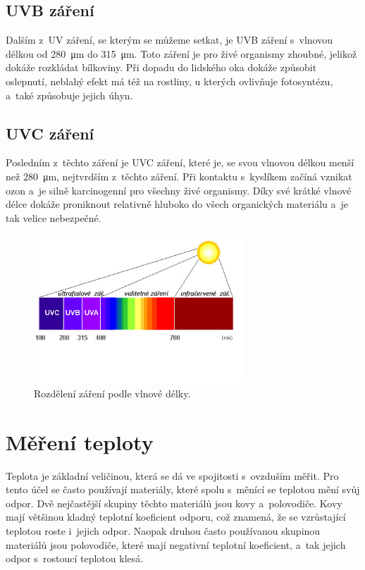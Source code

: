 \subsection{UVB záření}

Dalším z~UV záření, se kterým se můžeme setkat, je UVB záření s~vlnovou délkou od \SI{280}{\micro\metre} do \SI{315}{\micro\metre}. Toto záření je pro živé organismy zhoubné, jelikož dokáže rozkládat bílkoviny. Při dopadu do lidského oka dokáže způsobit oslepnutí, neblahý efekt má též na rostliny, u kterých ovlivňuje fotosyntézu, a~také způsobuje jejich úhyn.

\subsection{UVC záření}

Posledním z~těchto záření je UVC záření, které je, se svou vlnovou délkou menší než \SI{280}{\micro\metre}, nejtvrdším z~těchto záření. Při kontaktu s~kyslíkem začíná vznikat ozon a~je silně karcinogenní pro všechny živé organismy. Díky své krátké vlnové délce dokáže proniknout relativně hluboko do všech organických materiálu a~je tak velice nebezpečné.

\begin{figure}
    \centering
    \includegraphics[width=0.7\textwidth]{obrazky/uv_light.jpg}
    \caption{Rozdělení záření podle vlnové délky.\cite{picture_UVLight}}
    \label{fig_UVLight}
\end{figure}

\section{Měření teploty}

Teplota je základní veličinou, která se dá ve spojitosti s~ovzduším měřit. Pro tento účel se často používají materiály, které spolu s~měnící se teplotou mění svůj odpor. Dvě nejčastější skupiny těchto materiálů jsou kovy a~polovodiče. Kovy mají většinou kladný teplotní koeficient odporu, což znamená, že se vzrůstající teplotou roste i~jejich odpor. Naopak druhou často používanou skupinou materiálů jsou polovodiče, které mají negativní teplotní koeficient, a~tak jejich odpor s~rostoucí teplotou klesá.


